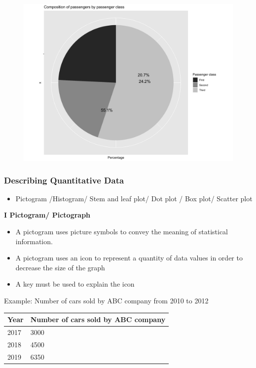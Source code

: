 \documentclass[]{book}
\providecommand{\tightlist}{%
  \setlength{\itemsep}{0pt}\setlength{\parskip}{0pt}}
\begin{document}
\begin{figure}

{\centering \includegraphics[width=1\linewidth]{figure/box13-1} 

}

\end{figure}

\hypertarget{describing-quantitative-data}{%
\subsubsection{Describing Quantitative Data}\label{describing-quantitative-data}}

\begin{itemize}
\tightlist
\item
  Pictogram /Histogram/ Stem and leaf plot/ Dot plot / Box plot/ Scatter plot
\end{itemize}

\textbf{I Pictogram/ Pictograph}

\begin{itemize}
\tightlist
\item
  A pictogram uses picture symbols to convey the meaning of statistical information.
\item
  A pictogram uses an icon to represent a quantity of data values in order to decrease the size of the graph
\item
  A key must be used to explain the icon
\end{itemize}

Example: Number of cars sold by ABC company from 2010 to 2012

\begin{longtable}[]{@{}ll@{}}
\toprule
Year & Number of cars sold by ABC company\tabularnewline
\midrule
\endhead
2017 & 3000\tabularnewline
2018 & 4500\tabularnewline
2019 & 6350\tabularnewline
\bottomrule
\end{longtable}
\end{document}
